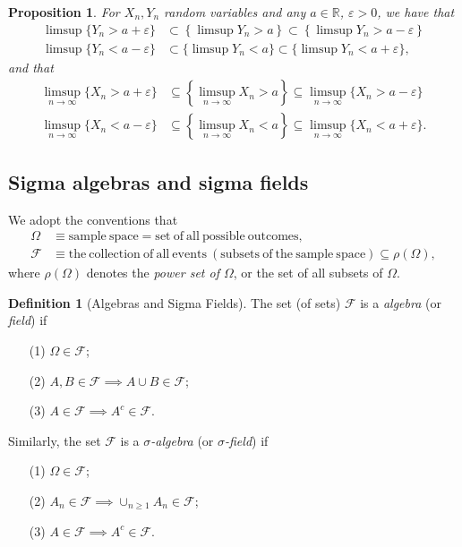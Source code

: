 \documentclass[12pt,reqno]{article}
\renewcommand{\emph}[1]{\textit{#1}}
\theoremstyle{plain}
\newtheorem{prop}[theorem]{Proposition}
\theoremstyle{definition}
\newtheorem{definition}[theorem]{Definition}
\begin{document}
\begin{prop} 
\label{prop_limsups_of_sets_containment_idents} 
For $X_n,Y_n$ random variables and any $a \in \mathbb{R}$, 
$\varepsilon > 0$, we have that 
\begin{align*} 
\limsup \{Y_n > a+\varepsilon\} & \subset \left\{\limsup Y_n > a\right\} 
     \subset \left\{\limsup Y_n > a - \varepsilon\right\} \\ 
\limsup \{Y_n < a-\varepsilon\} & \subset \{\limsup Y_n < a\} \subset 
     \{\limsup Y_n < a+\varepsilon\}, 
\end{align*} 
and that 
\begin{align*} 
\limsup_{n \rightarrow \infty} \{X_n > a+\varepsilon\} & \subseteq 
     \left\{\limsup_{n \rightarrow \infty} X_n > a\right\} \subseteq 
     \limsup_{n \rightarrow \infty} \{X_n > a-\varepsilon\} \\ 
\limsup_{n \rightarrow \infty} \{X_n < a-\varepsilon\} & \subseteq 
     \left\{\limsup_{n \rightarrow \infty} X_n < a\right\} \subseteq 
     \limsup_{n \rightarrow \infty} \{X_n < a+\varepsilon\}. 
\end{align*} 
\end{prop} 

\subsection{Sigma algebras and sigma fields} 

We adopt the conventions that 
\begin{align*} 
\Omega & \equiv \mathrm{sample\ space} = 
  \mathrm{set\ of\ all\ possible\ outcomes}, \\ 
\mathcal{F} & \equiv \mathrm{the\ collection\ of\ all\ events\ (subsets\ 
  of\ the\ sample\ space)} \subseteq \rho(\Omega), 
\end{align*} 
where $\rho(\Omega)$ denotes the \emph{power set of $\Omega$}, or the 
set of all subsets of $\Omega$. 

\begin{definition}[Algebras and Sigma Fields]
The set (of sets) $\mathcal{F}$ is a \emph{algebra} (or \emph{field}) if 
\begin{itemize} 

\item[(1)] $\Omega \in \mathcal{F}$; 
\item[(2)] $A,B \in \mathcal{F} \implies A \cup B \in \mathcal{F}$; 
\item[(3)] $A \in \mathcal{F} \implies A^{c} \in \mathcal{F}$. 

\end{itemize} 
Similarly, the set 
$\mathcal{F}$ is a \emph{$\sigma$-algebra} (or \emph{$\sigma$-field}) if 
\begin{itemize} 

\item[(1)] $\Omega \in \mathcal{F}$; 
\item[(2)] $A_n \in \mathcal{F} 
            \implies \cup_{n \geq 1} A_n \in \mathcal{F}$; 
\item[(3)] $A \in \mathcal{F} \implies A^{c} \in \mathcal{F}$. 

\end{itemize} 
\end{definition} 
\end{document}
